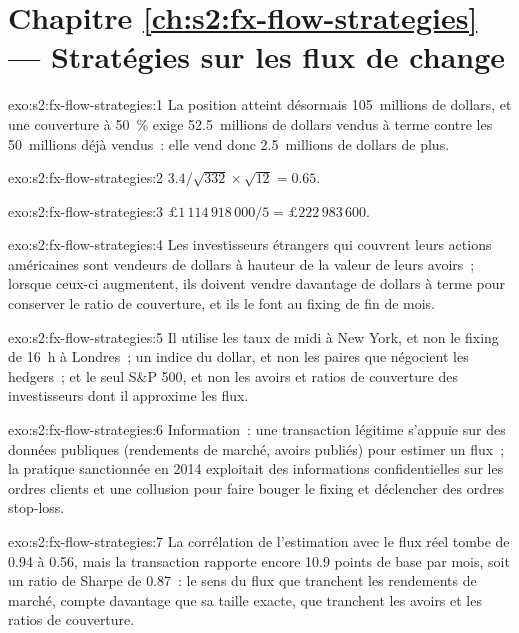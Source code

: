 \section*{Chapitre \ref{ch:s2:fx-flow-strategies} --- Stratégies sur les flux de change}

\begin{solution}{exo:s2:fx-flow-strategies:1}
La position atteint désormais 105~millions de dollars, et une couverture à 50~\% exige 52.5~millions de dollars vendus à terme contre les 50~millions déjà vendus~: elle vend donc 2.5~millions
de dollars de plus.
\end{solution}

\begin{solution}{exo:s2:fx-flow-strategies:2}
$3.4/\sqrt{332} \times \sqrt{12} = 0.65$.
\end{solution}

\begin{solution}{exo:s2:fx-flow-strategies:3}
$\pounds1\,114\,918\,000/5 = \pounds222\,983\,600$.
\end{solution}

\begin{solution}{exo:s2:fx-flow-strategies:4}
Les investisseurs étrangers qui couvrent leurs actions américaines sont vendeurs de dollars à hauteur de la valeur de leurs avoirs~; lorsque ceux-ci augmentent, ils doivent vendre davantage
de dollars à terme pour conserver le ratio de couverture, et ils le font au fixing de fin de mois.
\end{solution}

\begin{solution}{exo:s2:fx-flow-strategies:5}
Il utilise les taux de midi à New York, et non le fixing de 16~h à Londres~; un indice du dollar, et non les paires que négocient les hedgers~; et le seul S\&P 500, et non les avoirs et
ratios de couverture des investisseurs dont il approxime les flux.
\end{solution}

\begin{solution}{exo:s2:fx-flow-strategies:6}
Information~: une transaction légitime s'appuie sur des données publiques (rendements de marché, avoirs publiés) pour estimer un flux~; la pratique sanctionnée en 2014 exploitait des informations confidentielles
sur les ordres clients et une collusion pour faire bouger le fixing et déclencher des ordres stop-loss.
\end{solution}

\begin{solution}{exo:s2:fx-flow-strategies:7}
La corrélation de l'estimation avec le flux réel tombe de 0.94 à 0.56, mais la transaction rapporte encore 10.9 points de base par mois, soit un ratio de Sharpe de 0.87~: le sens du flux
que tranchent les rendements de marché, compte davantage que sa taille exacte, que tranchent les avoirs et les ratios de couverture.
\end{solution}

